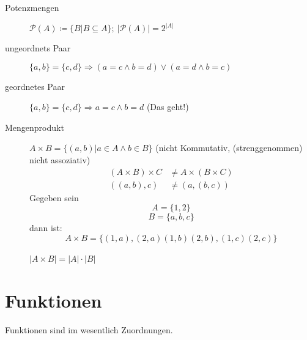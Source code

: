 \documentclass[12pt,a4paper]{article}
\begin{document}
\begin{description}
	\item[Potenzmengen] $\mathcal{P}(A) \coloneqq \lbrace B|B \subseteq A \rbrace;\ |\mathcal{P}(A)| = 2^{|A|}$

	\item[ungeordnets Paar] $\lbrace a,b \rbrace = \lbrace c,d \rbrace \Rightarrow (a=c \wedge b=d) \vee (a=d \wedge b=c)$

	\item[geordnetes Paar] $\lbrace a,b \rbrace = \lbrace c,d \rbrace \Rightarrow a=c \wedge b=d$ (Das geht!)

	\item[Mengenprodukt] $A \times B = \lbrace (a,b)|a \in A \wedge b \in B \rbrace$ (nicht Kommutativ, (strenggenommen) nicht assoziativ)
		\begin{align*}
			(A \times B) \times C & \not = A \times (B \times C) \\
			((a,b),c)             & \not = (a,(b,c))
		\end{align*}
		Gegeben sein
		$$A = \lbrace 1, 2 \rbrace$$
		$$B = \lbrace a, b, c \rbrace$$
		dann ist:
		$$A \times B = \lbrace (1,a),(2,a)(1,b)(2,b),(1,c)(2,c) \rbrace$$ \\
		$|A \times B| = |A| \cdot |B|$
\end{description}

\section{Funktionen}
Funktionen sind im wesentlich Zuordnungen.
\end{document}
